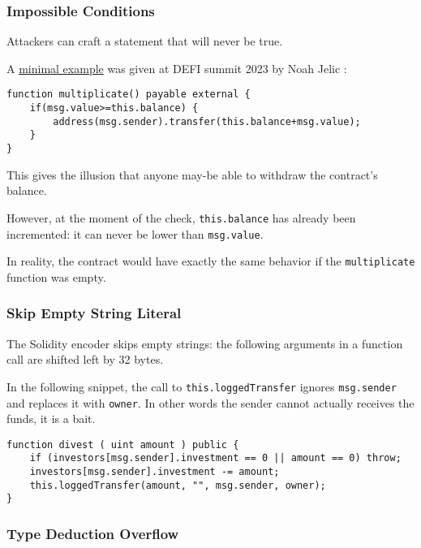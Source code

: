 \subsubsection{Impossible Conditions}

Attackers can craft a statement that will never be true.

A \href{https://www.youtube.com/watch?v=4bSQWoy5a_k}{minimal example} was given at DEFI summit 2023 by Noah Jelic \cite{video-hacker-traps}:

\begin{lstlisting}[language=Solidity]
function multiplicate() payable external {
    if(msg.value>=this.balance) {
        address(msg.sender).transfer(this.balance+msg.value);
    }
}
\end{lstlisting}

This gives the illusion that anyone may-be able to withdraw the contract's balance.

However, at the moment of the check, \lstinline[language=Solidity]{this.balance} has already been incremented: it can never be lower than \lstinline[language=Solidity]{msg.value}.

In reality, the contract would have exactly the same behavior if the \lstinline{multiplicate} function was empty.

\subsubsection{Skip Empty String Literal}

The Solidity encoder skips empty strings: the following arguments in a function call are shifted left by 32 bytes.

In the following snippet, the call to \lstinline[language=Solidity]{this.loggedTransfer} ignores \lstinline[language=Solidity]{msg.sender} and replaces it with \lstinline[language=Solidity]{owner}.
In other words the sender cannot actually receives the funds, it is a bait.

\pagebreak
\begin{lstlisting}[language=Solidity]
function divest ( uint amount ) public {
    if (investors[msg.sender].investment == 0 || amount == 0) throw;
    investors[msg.sender].investment -= amount;
    this.loggedTransfer(amount, "", msg.sender, owner);
}
\end{lstlisting}

\subsubsection{Type Deduction Overflow}

